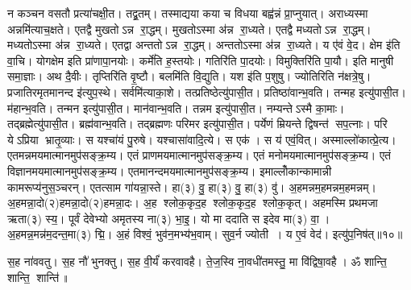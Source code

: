 न कञ्चन वसतौ प्रत्या॑चक्षी॒त। तद्व्र॒तम्। तस्माद्यया कया च विधया बह्व॑न्नं प्रा॒प्नुयात्। अराध्यस्मा अन्नमि॑त्याच॒क्षते। एतद्वै मुखतोऽन्न रा॒द्धम्। मुखतोऽस्मा अ॑न्न रा॒ध्यते। एतद्वै मध्यतोऽन्न रा॒द्धम्। मध्यतोऽस्मा अ॑न्न रा॒ध्यते। एतद्वा अन्ततोऽन्न रा॒द्धम्। अन्ततोऽस्मा अ॑न्न रा॒ध्यते। य ए॑वं वे॒द। क्षेम इ॑ति वा॒चि। योगक्षेम इति प्रा॑णापा॒नयोः। कर्मे॑ति ह॒स्तयोः। गतिरि॑ति पा॒दयोः। विमुक्तिरि॑ति पा॒यौ। इति मानुषी समा॒ज्ञाः। अथ दै॒वीः। तृप्तिरि॑ति वृ॒ष्टौ। बलमि॑ति वि॒द्युति। यश इ॑ति प॒शुषु। ज्योतिरिति न॑क्षत्रे॒षु। प्रजातिरमृतमानन्द इ॑त्युप॒स्थे। सर्वमि॑त्याका॒शे। तत्प्रतिष्ठेत्यु॑पासी॒त। प्रतिष्ठा॑वान्भ॒वति। तन्मह इत्यु॑पासी॒त। म॑हान्भ॒वति। तन्मन इत्यु॑पासी॒त। मान॑वान्भ॒वति। तन्नम इत्यु॑पासी॒त। नम्यन्तेऽस्मै का॒माः। तद्ब्रह्मेत्यु॑पासी॒त। ब्रह्म॑वान्भ॒वति। तद्ब्रह्मणः परिमर इत्यु॑पासी॒त। पर्येणं म्रियन्ते द्विषन्त॑ सप॒त्नाः। परि येऽप्रिया भ्रातृ॒व्याः। स यश्चा॑यं पु॒रुषे। यश्चासा॑वादि॒त्ये। स एक॑। स य॑ एवं॒वित्। अस्माल्लो॑कात्प्रे॒त्य। एतमन्नमयमात्मानमुप॑सङ्क्र॒म्य। एतं प्राणमयमात्मानमुप॑सङ्क्र॒म्य। एतं मनोमयमात्मानमुप॑सङ्क्र॒म्य। एतं विज्ञानमयमात्मानमुप॑\-सङ्क्र॒म्य। एतमानन्दमयमात्मानमुप॑सङ्क्र॒म्य। इमाल्लोँकान्कामान्नी कामरूप्य॑नुस॒ञ्चरन्। एतत्साम गा॑यन्ना॒स्ते। हा(३) वु॒ हा(३) वु॒ हा(३) वु॑। अ॒हमन्नम॒हमन्नम॒हमन्नम्। अ॒हमन्ना॒दो(२)\-\aav{}हमन्ना॒दो(२)\aav{}हमन्ना॒दः। अ॒ह श्लोक॒कृद॒ह श्लोक॒कृद॒ह श्लोक॒कृत्। अहमस्मि प्रथमजा ऋता(३) स्य॒। पूर्वं देवेभ्यो अमृतस्य ना(३) भा॒इ॒। यो मा ददाति स इदेव मा(३) वा॒। अ॒हमन्न॒मन्न॑म॒दन्त॒मा(३) द्मि॒। अ॒हं  विश्वं॒ भुव॑न॒मभ्य॑भ॒वाम्। सुव॒र्न ज्योती। य ए॒वं वेद॑। इत्यु॑प॒निष॑त्॥१०॥

स॒ह ना॑ववतु। स॒ह नौ॑ भुनक्तु। स॒ह वी॒र्यं॑ करवावहै। ते॒ज॒स्वि ना॒वधी॑तमस्तु॒ मा वि॑द्विषा॒वहै। ॐ शान्ति॒ शान्ति॒ शान्ति॑॥

\closesection


